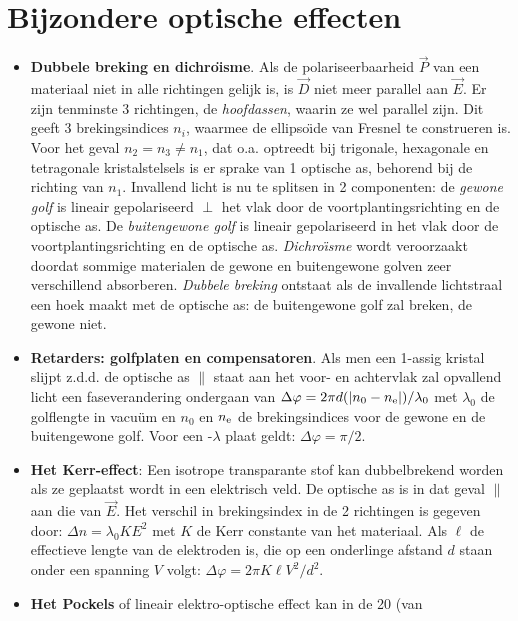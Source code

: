 \section{Bijzondere optische effecten}
\begin{itemize}
\item {\bf Dubbele breking en dichro\"{\i}sme}.
      Als de polariseerbaarheid $\vec{P}$ van een materiaal niet in alle
      richtingen gelijk is, is $\vec{D}$ niet meer parallel aan $\vec{E}$.
      Er zijn tenminste 3 richtingen, de {\it hoofdassen}, waarin ze wel
      parallel zijn. Dit geeft 3 brekingsindices $n_i$, waarmee de
      ellipso\"{\i}de van Fresnel te construeren is. Voor het geval
      $n_2=n_3\neq n_1$, dat o.a. optreedt bij trigonale, hexagonale en
      tetragonale kristalstelsels is er sprake van 1 optische as, behorend bij
      de richting van $n_1$. Invallend licht is nu te splitsen in 2
      componenten: de {\it gewone golf} is lineair gepolariseerd $\perp$ het
      vlak door de voortplantingsrichting en de optische as. De
      {\it buitengewone golf} is lineair gepolariseerd in het vlak door de
      voortplantingsrichting en de optische as.
      {\it Dichro\"{\i}sme} wordt veroorzaakt doordat sommige materialen de
      gewone en buitengewone golven zeer verschillend absorberen.
      {\it Dubbele breking} ontstaat als de invallende lichtstraal een hoek
      maakt met de optische as: de buitengewone golf zal breken, de gewone niet.
\item {\bf Retarders: golfplaten en compensatoren}. Als men een 1-assig
      kristal slijpt z.d.d. de optische as $\parallel$ staat aan het voor- en
      achtervlak zal opvallend licht een faseverandering ondergaan van
      $\Delta\varphi=2\pi d(|n_0-n_{\rm e}|)/\lambda_0$ met $\lambda_0$ de
      golflengte in vacu\"um en $n_0$ en $n_{\rm e}$ de brekingsindices voor
      de gewone en de buitengewone golf. Voor een \kwart-$\lambda$ plaat
      geldt: $\Delta\varphi=\pi/2$.
\item {\bf Het Kerr-effect}: Een isotrope transparante stof kan dubbelbrekend
      worden als ze geplaatst wordt in een elektrisch veld. De optische as is
      in dat geval $\parallel$ aan die van $\vec{E}$. Het verschil in
      brekingsindex in de 2 richtingen is gegeven door: $\Delta n=\lambda_0KE^2$
      met $K$ de Kerr constante van het materiaal. Als $\ell$ de effectieve
      lengte van de elektroden is, die op een onderlinge afstand $d$ staan
      onder een spanning $V$ volgt: $\Delta\varphi=2\pi K\ell V^2/d^2$.
\item {\bf Het Pockels} of lineair elektro-optische effect kan in de 20 (van

\end{itemize}
